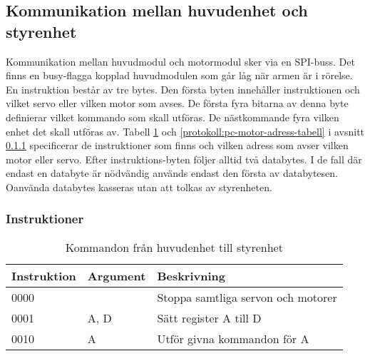 \subsection{Kommunikation mellan huvudenhet och styrenhet} \label{protokoll:pc-motor}
Kommunikation mellan huvudmodul och motormodul sker via en SPI-buss. Det finns en busy-flagga kopplad huvudmodulen som går låg när armen är i rörelse. \\
En instruktion består av tre bytes. Den första byten innehåller instruktionen och vilket servo eller vilken motor som avses. De första fyra bitarna av denna byte definierar vilket kommando som skall utföras. De nästkommande fyra vilken enhet det skall utföras av. Tabell \ref{protokoll:pc-motor-tabell} och \ref{protokoll:pc-motor-adress-tabell} i avsnitt \ref{designspec:protokoll-pc-motor-instr} specificerar de instruktioner som finns och vilken adress som avser vilken motor eller servo. Efter instruktions-byten följer alltid två databytes. I de fall där endast en databyte är nödvändig används endast den första av databytesen. Oanvända databytes kasseras utan att tolkas av styrenheten.


\subsubsection{Instruktioner} \label{designspec:protokoll-pc-motor-instr}

\begin{table}[h]
	\centering
		\begin{tabularx}{\textwidth}{| l | l | X |}
			\hline
			\textbf{Instruktion} & \textbf{Argument} & \textbf{Beskrivning} \\
			\hline
			{0000} & {} & {Stoppa samtliga servon och motorer} \\
			\hline
			{0001} & {A, D} & {Sätt register A till D} \\
			\hline
			{0010} & {A} & {Utför givna kommandon för A} \\
			\hline
		\end{tabularx}
	\caption{Kommandon från huvudenhet till styrenhet} \label{protokoll:pc-motor-tabell}
\end{table}

